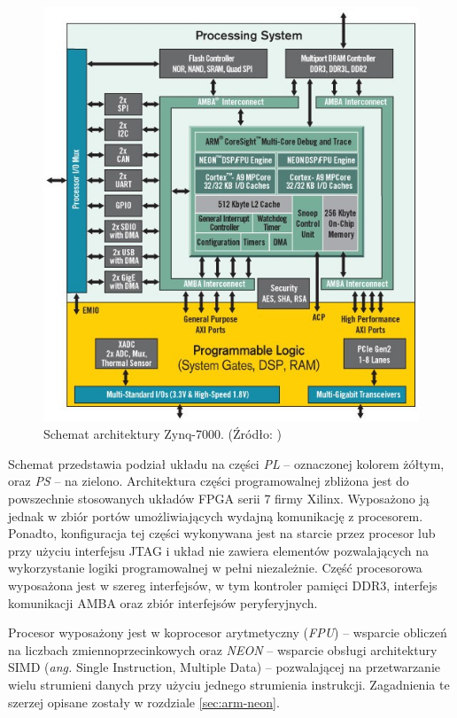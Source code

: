\begin{figure}[!htb]
	\centering
	\includegraphics[width=12cm]{img/zyng-platform.png}
	\caption{Schemat architektury Zynq-7000. (Źródło: \cite{zybo-reference-manual})}
	\label{fig:zynq-overview}
\end{figure}


Schemat przedstawia podział układu na części \emph{PL} -- oznaczonej kolorem żółtym, oraz \emph{PS} -- na zielono.
Architektura części programowalnej zbliżona jest do powszechnie stosowanych układów FPGA serii 7 firmy Xilinx.
Wyposażono ją jednak w zbiór portów umożliwiających wydajną komunikację z procesorem. 
Ponadto, konfiguracja tej części wykonywana jest na starcie przez procesor lub przy użyciu interfejsu JTAG i układ nie zawiera elementów pozwalających na wykorzystanie logiki programowalnej w pełni niezależnie.
Część procesorowa wyposażona jest w szereg interfejsów, w tym kontroler pamięci DDR3, interfejs komunikacji AMBA oraz zbiór interfejsów peryferyjnych.

Procesor wyposażony jest w koprocesor arytmetyczny (\emph{FPU}) -- wsparcie obliczeń  na liczbach zmiennoprzecinkowych oraz \emph{NEON} -- wsparcie obsługi architektury SIMD (\emph{ang.} Single Instruction, Multiple Data) -- pozwalającej na przetwarzanie wielu strumieni danych przy użyciu jednego strumienia instrukcji. 
Zagadnienia te szerzej opisane zostały w rozdziale \ref{sec:arm-neon}.



